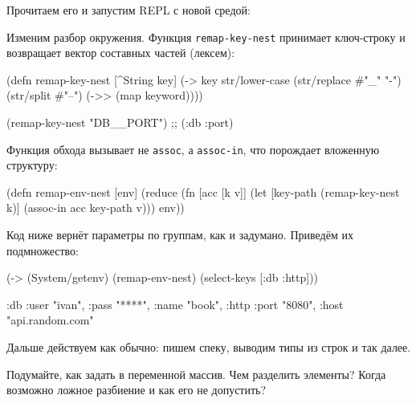 
\noindent
Прочитаем его и запустим REPL с новой средой:

\begin{english}
\end{english}

Изменим разбор окружения. Функция \verb|remap-key-nest| принимает ключ-строку и
возвращает вектор составных частей (лексем):

\begin{english}
  \begin{clojure}
(defn remap-key-nest
  [^String key]
  (-> key
      str/lower-case
      (str/replace #"_" "-")
      (str/split #"--")
      (->> (map keyword))))

(remap-key-nest "DB__PORT")
;; (:db :port)
  \end{clojure}
\end{english}


\noindent
Функция обхода вызывает не \verb|assoc|, а \verb|assoc-in|, что порождает
вложенную структуру:

\begin{english}
  \begin{clojure}
(defn remap-env-nest
  [env]
  (reduce
   (fn [acc [k v]]
     (let [key-path (remap-key-nest k)]
       (assoc-in acc key-path v)))
   {}
   env))
  \end{clojure}
\end{english}

Код ниже вернёт параметры по группам, как и задумано. Приведём их подмножество:

\begin{english}
  \begin{clojure}
(-> (System/getenv)
    (remap-env-nest)
    (select-keys [:db :http]))

{:db {:user "ivan", :pass "****", :name "book"},
 :http {:port "8080", :host "api.random.com"}}
  \end{clojure}
\end{english}

\noindent
Дальше действуем как обычно: пишем спеку, выводим типы из строк и так далее.

Подумайте, как задать в переменной массив. Чем разделить элементы? Когда
возможно ложное разбиение и как его не допустить?

